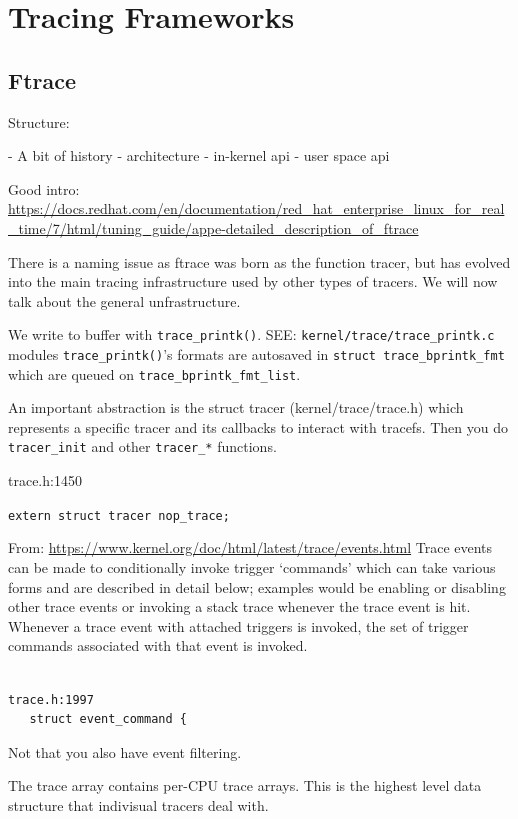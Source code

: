 \section{Tracing Frameworks}

\subsection{Ftrace}

Structure:

- A bit of history
- architecture
- in-kernel api
- user space api

Good intro:
\url{https://docs.redhat.com/en/documentation/red_hat_enterprise_linux_for_real_time/7/html/tuning_guide/appe-detailed_description_of_ftrace}

There is a naming issue as ftrace was born as the function tracer, but has
evolved into the main tracing infrastructure used by other types of tracers. We
will now talk about the general unfrastructure.

We write to buffer with \verb|trace_printk()|.  SEE:
\verb|kernel/trace/trace_printk.c| modules \verb|trace_printk()|'s formats are
autosaved in \verb|struct trace_bprintk_fmt| which are queued on
\verb|trace_bprintk_fmt_list|.

An important abstraction is the struct tracer (kernel/trace/trace.h) which
represents a specific tracer and its callbacks to interact with tracefs. Then
you do \verb|tracer_init| and other \verb|tracer_*| functions.

trace.h:1450

   \verb|extern struct tracer nop_trace;|

From: \url{https://www.kernel.org/doc/html/latest/trace/events.html} Trace
events can be made to conditionally invoke trigger ‘commands’ which can take
various forms and are described in detail below; examples would be enabling or
disabling other trace events or invoking a stack trace whenever the trace event
is hit. Whenever a trace event with attached triggers is invoked, the set of
trigger commands associated with that event is invoked.

\begin{verbatim}

trace.h:1997
   struct event_command {

\end{verbatim}

Not that you also have event filtering.

The trace array contains per-CPU trace arrays. This is the highest level data
structure that indivisual tracers deal with.

